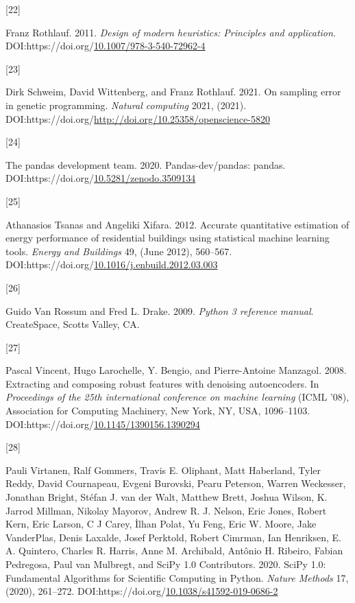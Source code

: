 \documentclass[
  11pt,
]{article}
\newlength{\cslhangindent}
\newlength{\csllabelwidth}
\newlength{\cslentryspacingunit} %
\newenvironment{CSLReferences}[2] %
 {%
  \setlength{\parindent}{0pt}
  \ifodd #1
  \let\oldpar\par
  \def\par{\hangindent=\cslhangindent\oldpar}
  \fi
  \setlength{\parskip}{#2\cslentryspacingunit}
 }%
 {}
\newcommand{\CSLLeftMargin}[1]{\parbox[t]{\csllabelwidth}{#1}}
\newcommand{\CSLRightInline}[1]{\parbox[t]{\linewidth - \csllabelwidth}{#1}\break}
\begin{document}
\begin{CSLReferences}{0}{0}
\leavevmode{}%
\CSLLeftMargin{{[}22{]} }%
\CSLRightInline{Franz Rothlauf. 2011. \emph{Design of modern heuristics: Principles and application}. DOI:https://doi.org/\href{https://doi.org/10.1007/978-3-540-72962-4}{10.1007/978-3-540-72962-4}}

\leavevmode{}%
\CSLLeftMargin{{[}23{]} }%
\CSLRightInline{Dirk Schweim, David Wittenberg, and Franz Rothlauf. 2021. On sampling error in genetic programming. \emph{Natural computing} 2021, (2021). DOI:https://doi.org/\url{http://doi.org/10.25358/openscience-5820}}

\leavevmode{}%
\CSLLeftMargin{{[}24{]} }%
\CSLRightInline{The pandas development team. 2020. Pandas-dev/pandas: pandas. DOI:https://doi.org/\href{https://doi.org/10.5281/zenodo.3509134}{10.5281/zenodo.3509134}}

\leavevmode{}%
\CSLLeftMargin{{[}25{]} }%
\CSLRightInline{Athanasios Tsanas and Angeliki Xifara. 2012. Accurate quantitative estimation of energy performance of residential buildings using statistical machine learning tools. \emph{Energy and Buildings} 49, (June 2012), 560--567. DOI:https://doi.org/\href{https://doi.org/10.1016/j.enbuild.2012.03.003}{10.1016/j.enbuild.2012.03.003}}

\leavevmode{}%
\CSLLeftMargin{{[}26{]} }%
\CSLRightInline{Guido Van Rossum and Fred L. Drake. 2009. \emph{Python 3 reference manual}. CreateSpace, Scotts Valley, CA.}

\leavevmode{}%
\CSLLeftMargin{{[}27{]} }%
\CSLRightInline{Pascal Vincent, Hugo Larochelle, Y. Bengio, and Pierre-Antoine Manzagol. 2008. Extracting and composing robust features with denoising autoencoders. In \emph{Proceedings of the 25th international conference on machine learning} (ICML '08), Association for Computing Machinery, New York, NY, USA, 1096--1103. DOI:https://doi.org/\href{https://doi.org/10.1145/1390156.1390294}{10.1145/1390156.1390294}}

\leavevmode{}%
\CSLLeftMargin{{[}28{]} }%
\CSLRightInline{Pauli Virtanen, Ralf Gommers, Travis E. Oliphant, Matt Haberland, Tyler Reddy, David Cournapeau, Evgeni Burovski, Pearu Peterson, Warren Weckesser, Jonathan Bright, Stéfan J. van der Walt, Matthew Brett, Joshua Wilson, K. Jarrod Millman, Nikolay Mayorov, Andrew R. J. Nelson, Eric Jones, Robert Kern, Eric Larson, C J Carey, İlhan Polat, Yu Feng, Eric W. Moore, Jake VanderPlas, Denis Laxalde, Josef Perktold, Robert Cimrman, Ian Henriksen, E. A. Quintero, Charles R. Harris, Anne M. Archibald, Antônio H. Ribeiro, Fabian Pedregosa, Paul van Mulbregt, and SciPy 1.0 Contributors. 2020. {{SciPy} 1.0: Fundamental Algorithms for Scientific Computing in Python}. \emph{Nature Methods} 17, (2020), 261--272. DOI:https://doi.org/\href{https://doi.org/10.1038/s41592-019-0686-2}{10.1038/s41592-019-0686-2}}


\end{CSLReferences}
\end{document}
